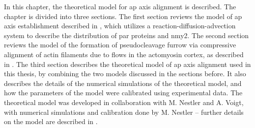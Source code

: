 In this chapter, the theoretical model for \ac{ap} axis alignment is described. The chapter is divided into three sections. The first section reviews the model of \ac{ap} axis establishment described in \cite{gross2019guiding}, which utilizes a reaction-diffusion-advection system to describe the distribution of \ac{par} proteins and \ac{nmy2}. The second section reviews the model of the formation of pseudocleavage furrow via compressive alignment of actin filaments due to flows in the actomyosin cortex, as described in \cite{reymann2016cortical}. The third section describes the theoretical model of \ac{ap} axis alignment used in this thesis, by combining the two models discussed in the sections before. It also describes the details of the numerical simulations of the theoretical model, and how the parameters of the model were calibrated using experimental data. The theoretical model was developed in collaboration with M. Nestler and A. Voigt, with numerical simulations and calibration done by M. Nestler -- further details on the model are described in \cite{axisConvergence}.

